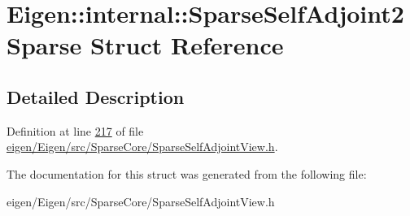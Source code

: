 \hypertarget{struct_eigen_1_1internal_1_1_sparse_self_adjoint2_sparse}{}\section{Eigen\+:\+:internal\+:\+:Sparse\+Self\+Adjoint2\+Sparse Struct Reference}
\label{struct_eigen_1_1internal_1_1_sparse_self_adjoint2_sparse}


\subsection{Detailed Description}


Definition at line \hyperlink{eigen_2_eigen_2src_2_sparse_core_2_sparse_self_adjoint_view_8h_source_l00217}{217} of file \hyperlink{eigen_2_eigen_2src_2_sparse_core_2_sparse_self_adjoint_view_8h_source}{eigen/\+Eigen/src/\+Sparse\+Core/\+Sparse\+Self\+Adjoint\+View.\+h}.



The documentation for this struct was generated from the following file\+:\begin{DoxyCompactItemize}
\item 
eigen/\+Eigen/src/\+Sparse\+Core/\+Sparse\+Self\+Adjoint\+View.\+h\end{DoxyCompactItemize}
